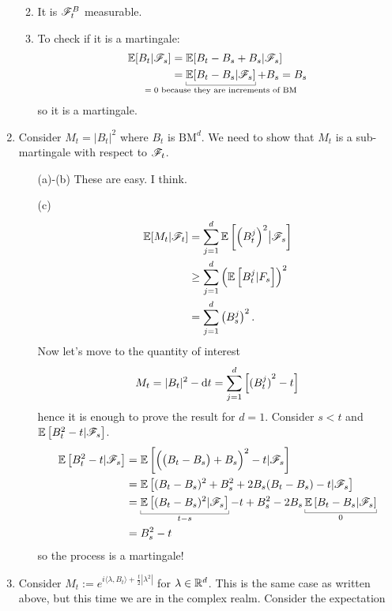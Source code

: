 \documentclass[12pt]{report}
\begin{document}
\begin{fancyproof}
\begin{enumerate}
\begin{enumerate}
\begin{insult}
		\end{insult}
		\item It is $\F_{t}^{B}$ measurable.
		\item To check if it is a martingale: 
		\begin{align*}
			\evs[B_{t}|\F_{s}]&=\evs[B_{t}-B_{s}+B_{s}|\F_{s}]\\
			&=\ubracketthin{\evs[B_{t}-B_{s}|\F_{s}]}_{\claptext{$= 0$ because they are increments of BM}}+B_{s}=B_{s}
		\end{align*}
		so it is a martingale.
	\end{enumerate}
	\item Consider $M_{t}=|B_{t}|^{2}$ where $B_{t}$ is $\mathrm{BM}^{d}$. We need to show that $M_{t}$ is a sub-martingale with respect to $\mathscr{F}_{t}$.
	\begin{enumerate}
		\item[(a)-(b)] These are easy. I think.
		\item[(c)]\begin{align*}
			\mathbb{E}[M_{t}|\mathscr{F}_{t}]&=\sum_{j=1}^{d}\mathbb{E}\left[{\left(B_{t}^{j}\right)}^{2}\big|\mathscr{F}_{s}\right]\\
			&\geq\sum_{j=1}^{d}\left(\mathbb{E}\left[B^{j}_{t}|F_{s}\right]\right)^{2}\\
			&=\sum_{j=1}^{d}\left(B^{j}_{s}\right)^{2}.
		\end{align*}
		Now let's move to the quantity of interest
		\begin{equation*}
			M_{t}=|B_{t}|^{2}-\mathop{}\!\mathrm{d} t=\sum_{j=1}^{d}\left[{(B^{j}_{t})}^{2}-t\right]
		\end{equation*}
		hence it is enough to prove the result for $d=1$. Consider $s<t$ and $\mathbb{E}\left[B^{2}_{t}-t|\mathscr{F}_{s}\right]$.
		\begin{align*}
			\evs\left[B^{2}_{t}-t|\F_{s}\right]&=\evs\left[\Bigl(\bigl(B_{t}-B_{s}\bigr)+B_{s}\Bigr)^{2}-t|\F_{s}\right]\\
			&=\evs\left[(B_{t}-B_{s})^{2}+B_{s}^{2}+2B_{s}(B_{t}-B_{s})-t|\F_{s}\right]\\
			&=\ubracketthin{\evs\left[(B_{t}-B_{s})^{2}|\F_{s}\right]}_{t-s}-t+B_{s}^{2}-2B_{s}\ubracketthin{\evs\left[B_{t}-B_{s}|\F_{s}\right]}_{0}\\
			&=B_{s}^{2}-t
		\end{align*}
		so the process is a martingale!
	\end{enumerate}
	\item Consider $M_{t}:=e^{i\langle\lambda,B_{t}\rangle+\frac{t}{2}|\lambda^{2}|}$ for $\lambda\in\mathbb{R}^{d}$. This is the same case as written above, but this time we are in the complex realm. Consider the expectation

\end{enumerate}
\end{fancyproof}
\end{document}
